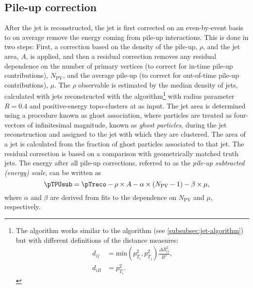 \subsection{Pile-up correction}
After the jet is reconstructed, the jet \pTreco is first corrected on an even-by-event basis to on average remove the energy coming from pile-up interactions. This is done in two steps: First, a correction based on the \pT density of the pile-up, $\rho$, and the jet area, $A$, is applied, and then a residual correction removes any residual \pT dependence on the number of primary vertices (to correct for in-time pile-up contributions), $N_\text{PV}$, and the average pile-up (to correct for out-of-time pile-up contributions), $\mu$.
The $\rho$ observable is estimated by the median \pT density of jets, calculated with jets reconstructed with the \kt algorithm\footnote{The \kt algorithm works similar to the \antikt algorithm (see \cref{subsubsec:jet-algorithm}) but with different definitions of the distance measures:
    \begin{align*}
        d_{ij} & = \text{min}\left(p_{T_i}^2,p_{T_j}^2\right) \frac{\Delta R_{ij}^2}{R^2}, \\
        d_{iB} & = p_{T_i}^2.
        \label{eq:kt-distances}
    \end{align*}
}
with radius parameter $R = 0.4$ and positive-energy topo-clusters at  as input. The jet area is determined using a procedure known as ghost association, where particles are treated as four-vectors of infinitesimal magnitude, known as \emph{ghost particles}, during the jet reconstruction and assigned to the jet with which they are clustered. The area of a jet is calculated from the fraction of ghost particles associated to that jet.
The residual correction is based on a comparison with geometrically matched truth jets. The energy after all pile-up corrections, referred to as the \emph{pile-up subtracted (energy) scale}, can be written as
\begin{equation}
    \pTPUsub = \pTreco - \rho \times A - \alpha \times \left( N_{\text{PV}} - 1\right) - \beta \times \mu,
\end{equation}
where $\alpha$ and $\beta$ are derived from fits to the \pT dependence on $N_{\text{PV}}$ and $\mu$, respectively.

